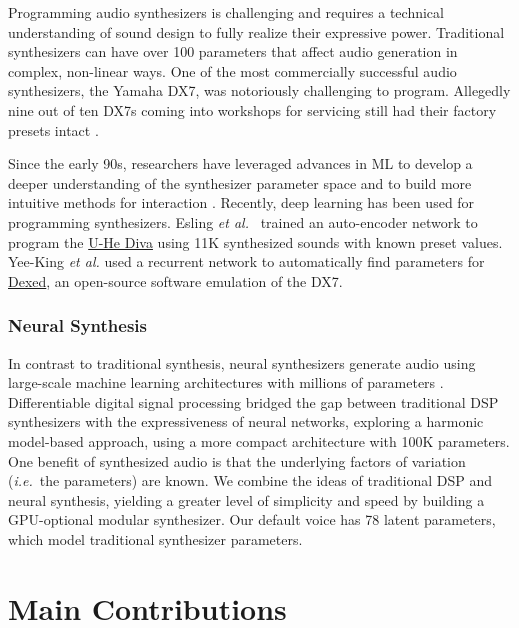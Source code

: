 Programming audio synthesizers is challenging and requires a technical understanding of sound design to fully realize their expressive power. Traditional synthesizers can have over 100 parameters that affect audio generation in complex, non-linear ways. One of the most commercially successful audio synthesizers, the Yamaha DX7, was notoriously challenging to program. Allegedly nine out of ten DX7s coming into workshops for servicing still had their factory presets intact \cite{seago2004critical}.

Since the early 90s, researchers have leveraged advances in ML to develop a deeper understanding of the synthesizer parameter space and to build more intuitive methods for interaction \cite{horner1993machine}. Recently, deep learning has been used for programming synthesizers.  Esling {\em et al.}\ \cite{esling2020flow} trained an auto-encoder network to program the \href{https://u-he.com/products/diva/}{U-He Diva} using 11K synthesized sounds with known preset values. Yee-King {\em et al.} \cite{yee2018automatic} used a recurrent network to automatically find parameters for \href{https://asb2m10.github.io/dexed/}{Dexed}, an open-source software emulation of the DX7.

\subsubsection{Neural Synthesis}

In contrast to traditional synthesis, neural synthesizers generate audio using large-scale machine learning architectures with millions of parameters \cite{engel2017neural}. Differentiable digital signal processing \cite{engel2020ddsp} bridged the gap between traditional DSP synthesizers with the expressiveness of neural networks, exploring a harmonic model-based approach, using a more compact architecture with 100K parameters.
One benefit of synthesized audio is that the underlying factors of variation ({\em i.e.}~the parameters) are known. We combine the ideas of traditional DSP and neural synthesis, yielding a greater level of simplicity and speed by building a GPU-optional modular synthesizer. Our default voice has 78 latent parameters, which model traditional synthesizer parameters. 

\section{Main Contributions}
\label{sec:contributions}

